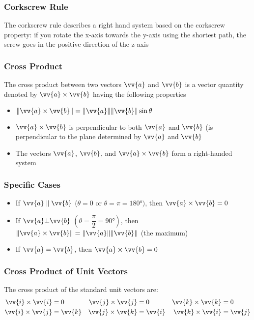 \documentclass{article}
\newcommand{\mv}[1]{
	\lVert\vv{#1}\rVert
}
\begin{document}
	\subsubsection{Corkscrew Rule}
	The corkscrew rule describes a right hand system based on the corkscrew property: if you rotate the x-axis towards the y-axis using the shortest path, the screw goes in the positive direction of the z-axis
	\subsubsection{Cross Product}
	The cross product between two vectors $\vv{a}$ and $\vv{b}$ is a vector quantity denoted by $\vv{a}\times\vv{b}$ having the following properties
	\begin{itemize}
		\item $\lVert\vv{a}\times\vv{b}\rVert=\mv{a}\mv{b}\sin\theta$
		\item $\vv{a}\times\vv{b}$ is perpendicular to both $\vv{a}$ and $\vv{b}$ (is perpendicular to the plane determined by $\vv{a}$ and $\vv{b}$
		\item The vectors $\vv{a}$, $\vv{b}$, and $\vv{a}\times\vv{b}$ form a right-handed system
	\end{itemize}
	\subsubsection{Specific Cases}
	\begin{itemize}
		\item If $\vv{a}\parallel\vv{b}$ ($\theta=0$ or $\theta=\pi=\ang{180})$, then $\vv{a}\times\vv{b}=0$
		\item If $\vv{a}\bot\vv{b}$ $\left(\theta=\dfrac{\pi}{2}=\ang{90}\right)$, then $\lVert\vv{a}\times\vv{b}\rVert=\mv{a}\mv{b}$ (the maximum)
		\item If $\vv{a}=\vv{b}$, then $\vv{a}\times\vv{b}=0$
	\end{itemize}
	\subsubsection{Cross Product of Unit Vectors}
	The cross product of the standard unit vectors are:
	\begin{align*}
		\vv{i}\times\vv{i}&=0&\vv{j}\times\vv{j}&=0&\vv{k}\times\vv{k}&=0\\
		\vv{i}\times\vv{j}&=\vv{k}&\vv{j}\times\vv{k}&=\vv{i}&\vv{k}\times\vv{i}&=\vv{j}
	\end{align*}
\end{document}
